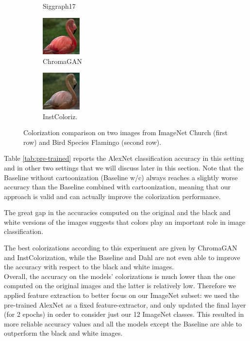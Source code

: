 \begin{figure}[t]
\begin{subfigure}[b]{0.1\textwidth}
		\caption{Siggraph17}
	\end{subfigure}
	\hfill
	\begin{subfigure}[b]{0.1\textwidth}
		\includegraphics[width=2cm]{chr - flamingo.jpg}
		\caption{ChromaGAN}
	\end{subfigure}
	\hfill
	\begin{subfigure}[b]{0.1\textwidth}
		\includegraphics[width=2cm]{su - flamingo.png}
		\caption{InstColoriz.}
	\end{subfigure}
	\caption{{\small Colorization comparison on two images from ImageNet Church (first row) and Bird Species Flamingo (second row).}}
	\label{fig:imagenet}
\end{figure}

Table \ref{tab:pre-trained} reports the AlexNet classification accuracy in this setting and in other two settings that we will discuss later in this section. Note that the Baseline without cartoonization (Baseline w/c) always reaches a slightly worse accuracy than the Baseline combined with cartoonization, meaning that our approach is valid and can actually improve the colorization performance.

The great gap in the accuracies computed on the original and the black and white versions of the images suggests that colors play an important role in image classification.

The best colorizations according to this experiment are given by ChromaGAN and InstColorization, while the Baseline and Dahl are not even able to improve the accuracy with respect to the black and white images.\\

Overall, the accuracy on the models' colorizations is much lower than the one computed on the original images and the latter is relatively low. Therefore we applied feature extraction to better focus on our ImageNet subset: we used the pre-trained AlexNet as a fixed feature-extractor, and only updated the final layer (for 2 epochs) in order to consider just our 12 ImageNet classes. This resulted in more reliable accuracy values and all the models except the Baseline are able to outperform the black and white images.\\

